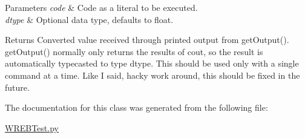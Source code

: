 \begin{DoxyParams}{Parameters}
{\em code} & Code as a literal to be executed. \\
\hline
{\em dtype} & Optional data type, defaults to float. \\
\hline
\end{DoxyParams}
\begin{DoxyReturn}{Returns}
Converted value received through printed output from get\+Output(). get\+Output() normally only returns the results of cout, so the result is automatically typecasted to type dtype. This should be used only with a single command at a time. Like I said, hacky work around, this should be fixed in the future. 
\end{DoxyReturn}


The documentation for this class was generated from the following file\+:\begin{DoxyCompactItemize}
\item 
\hyperlink{_w_r_e_b_test_8py}{W\+R\+E\+B\+Test.\+py}\end{DoxyCompactItemize}
